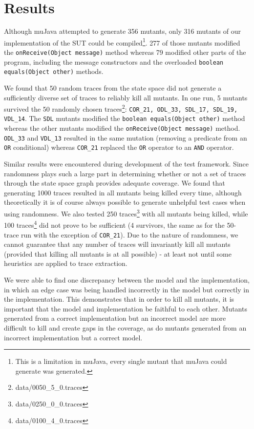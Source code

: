 \documentclass{article}
\begin{document}
	\section{Results}
	Although muJava attempted to generate 356 mutants, only 316 mutants of our implementation of the SUT could be compiled\footnote{This is a limitation in muJava, every single mutant that muJava could generate was generated.}. 277 of those mutants modified the \texttt{onReceive(Object message)} method whereas 79 modified other parts of the program, including the message constructors and the overloaded \texttt{boolean equals(Object other)} methods.

		We found that 50 random traces from the state space did not generate a sufficiently diverse set of traces to reliably kill all mutants.
		In one run, 5 mutants survived the 50 randomly chosen traces\footnote{data/0050\_5\_0.traces}: \texttt{COR\_21, ODL\_33, SDL\_17, SDL\_19, VDL\_14}. The \texttt{SDL} mutants modified the \texttt{boolean equals(Object other)} method whereas the other mutants modified the \texttt{onReceive(Object message)} method. \texttt{ODL\_33} and \texttt{VDL\_13} resulted in the same mutation (removing a predicate from an \texttt{OR} conditional) whereas \texttt{COR\_21} replaced the \texttt{OR} operator to an \texttt{AND} operator.

		Similar results were encountered during development of the test framework. Since randomness plays such a large part in determining whether or not a set of traces through the state space graph provides adequate coverage. We found that generating 1000 traces resulted in all mutants being killed every time, although theoretically it is of course always possible to generate unhelpful test cases when using randomness. We also tested 250 traces\footnote{data/0250\_0\_0.traces} with all mutants being killed, while 100 traces\footnote{data/0100\_4\_0.traces} did not prove to be sufficient (4 survivors, the same as for the 50-trace run with the exception of \texttt{COR\_21}). Due to the nature of randomness, we cannot guarantee that any number of traces will invariantly kill all mutants (provided that killing all mutants is at all possible) \-- at least not until some heuristics are applied to trace extraction.

		We were able to find one discrepancy between the model and the implementation, in which an edge case was being handled incorrectly in the model but correctly in the implementation. This demonstrates that in order to kill all mutants, it is important that the model and implementation be faithful to each other. Mutants generated from a correct implementation but an incorrect model are more difficult to kill and create gaps in the coverage, as do mutants generated from an incorrect implementation but a correct model.
\end{document}
